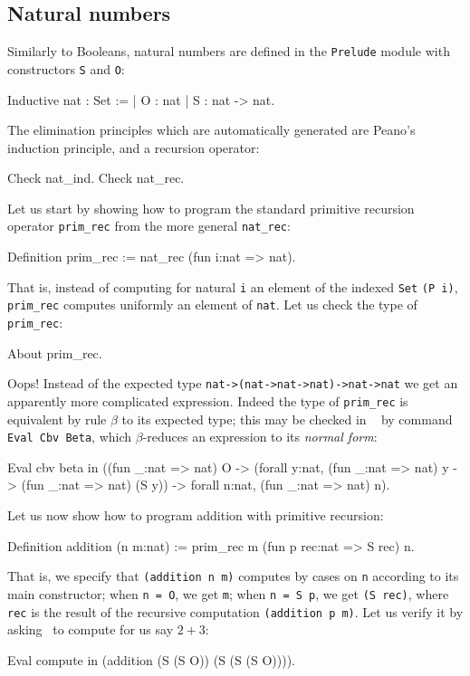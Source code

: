 \documentclass[11pt,a4paper]{book}
\begin{document}
\subsection{Natural numbers}

Similarly to Booleans, natural numbers are defined in the \verb:Prelude:
module with constructors \verb:S: and \verb:O::
\begin{coq_example}
Inductive nat : Set :=
  | O : nat
  | S : nat -> nat.
\end{coq_example}

The elimination principles which are automatically generated are Peano's
induction principle, and a recursion operator:
\begin{coq_example}
Check nat_ind.
Check nat_rec.
\end{coq_example}

Let us start by showing how to program the standard primitive recursion
operator \verb:prim_rec: from the more general \verb:nat_rec::
\begin{coq_example}
Definition prim_rec := nat_rec (fun i:nat => nat).
\end{coq_example}

That is, instead of computing for natural \verb:i: an element of the indexed
\verb:Set: \verb:(P i):, \verb:prim_rec: computes uniformly an element of 
\verb:nat:. Let us check the type of \verb:prim_rec::
\begin{coq_example}
About prim_rec.
\end{coq_example}

Oops! Instead of the expected type \verb+nat->(nat->nat->nat)->nat->nat+ we
get an apparently more complicated expression. Indeed the type of
\verb:prim_rec: is equivalent by rule $\beta$ to its expected type; this may
be checked in \Coq~ by command \verb:Eval Cbv Beta:, which $\beta$-reduces
an expression to its {\sl normal form}:
\begin{coq_example}
Eval cbv beta in
  ((fun _:nat => nat) O ->
   (forall y:nat, 
      (fun _:nat => nat) y -> (fun _:nat => nat) (S y)) ->
   forall n:nat, (fun _:nat => nat) n).
\end{coq_example}

Let us now show how to program addition with primitive recursion:
\begin{coq_example}
Definition addition (n m:nat) :=
    prim_rec m (fun p rec:nat => S rec) n.
\end{coq_example}

That is, we specify that \verb+(addition n m)+ computes by cases on \verb:n:
according to its main constructor; when \verb:n = O:, we get \verb:m:;
 when \verb:n = S p:, we get \verb:(S rec):, where \verb:rec: is the result
of the recursive computation \verb+(addition p m)+. Let us verify it by
asking \Coq~to compute for us say $2+3$:
\begin{coq_example}
Eval compute in (addition (S (S O)) (S (S (S O)))).
\end{coq_example}
\end{document}
